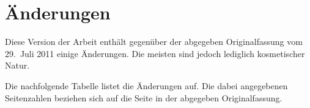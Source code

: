 \parskip 10pt
\chapter*{Änderungen}

Diese Version der Arbeit enthält gegenüber der abgegeben Originalfassung 
vom 29.~Juli 2011 einige Änderungen. Die meisten sind jedoch 
lediglich kosmetischer Natur.

Die nachfolgende Tabelle listet die Änderungen auf. Die dabei angegebenen 
Seitenzahlen beziehen sich auf die Seite in der abgegeben Originalfassung.

\bigskip

\setlength\tabcolsep{.75em}
\setlength\arrayrulewidth{1pt}
